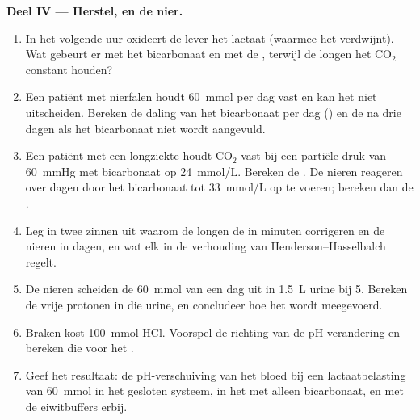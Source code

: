\begin{problem}
\medskip
\noindent\textbf{Deel IV --- Herstel, en de nier.}
\begin{enumerate}[resume]
  \item In het volgende uur oxideert de lever het lactaat (waarmee het
         verdwijnt). Wat gebeurt er met het bicarbonaat en met de ,
        terwijl de longen het $\mathrm{CO_2}$ constant houden?
  \item Een patiënt met nierfalen houdt \qty{60}{mmol}  per dag vast
        en kan het niet uitscheiden. Bereken de daling van het bicarbonaat
        per dag () en de  na drie dagen als het bicarbonaat
        niet wordt aangevuld.
  \item Een patiënt met een longziekte houdt $\mathrm{CO_2}$ vast bij een
        partiële druk van \qty{60}{mmHg} met bicarbonaat op
        \qty{24}{mmol/L}. Bereken de . De nieren reageren over dagen
        door het bicarbonaat tot \qty{33}{mmol/L} op te voeren; bereken
        dan de .
  \item Leg in twee zinnen uit waarom de longen de  in minuten
        corrigeren en de nieren in dagen, en wat elk in de verhouding van
        Henderson--Hasselbalch regelt.
  \item De nieren scheiden de \qty{60}{mmol}  van een dag uit in
        \qty{1.5}{L} urine bij  5. Bereken de vrije protonen in die
        urine, en concludeer hoe het  wordt meegevoerd.
  \item Braken kost \qty{100}{mmol} HCl. Voorspel de richting van de
        pH-verandering en bereken die voor het .
  \item Geef het resultaat: de pH-verschuiving van het bloed bij een
        lactaatbelasting van \qty{60}{mmol} in het gesloten systeem, in het
         met alleen bicarbonaat, en met de eiwitbuffers erbij.
\end{enumerate}
\end{problem}

